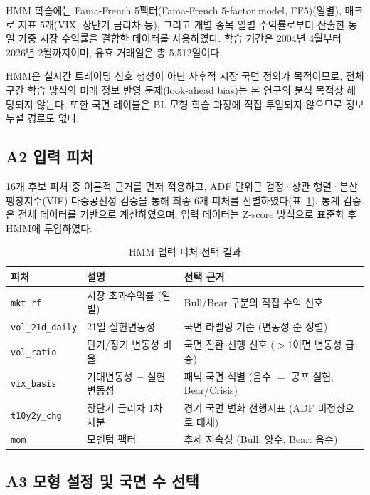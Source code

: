 \documentclass{article}
\begin{document}
HMM 학습에는 Fama-French 5팩터(Fama-French 5-factor model, FF5)(일별), 매크로 지표 5개(VIX, 장단기 금리차 등), 그리고 개별 종목 일별 수익률로부터 산출한 동일 가중 시장 수익률을 결합한 데이터를 사용하였다. 학습 기간은 2004년 4월부터 2026년 2월까지이며, 유효 거래일은 총 5,512일이다.

HMM은 실시간 트레이딩 신호 생성이 아닌 사후적 시장 국면 정의가 목적이므로, 전체 구간 학습 방식의 미래 정보 반영 문제(look-ahead bias)는 본 연구의 분석 목적상 해당되지 않는다. 또한 국면 레이블은 BL 모형 학습 과정에 직접 투입되지 않으므로 정보 누설 경로도 없다.

\subsection*{A2 입력 피처}

16개 후보 피처 중 이론적 근거를 먼저 적용하고, ADF 단위근 검정·상관 행렬·분산팽창지수(VIF) 다중공선성 검증을 통해 최종 6개 피처를 선별하였다(표~\ref{tab:a1_features}). 통계 검증은 전체 데이터를 기반으로 계산하였으며, 입력 데이터는 Z-score 방식으로 표준화 후 HMM에 투입하였다.

\begin{table}[ht]
\centering
\caption{HMM 입력 피처 선택 결과}
\label{tab:a1_features}
\begin{tabular}{lll}
\toprule
\textbf{피처} & \textbf{설명} & \textbf{선택 근거} \\
\midrule
\texttt{mkt\_rf}       & 시장 초과수익률 (일별)     & Bull/Bear 구분의 직접 수익 신호 \\
\texttt{vol\_21d\_daily} & 21일 실현변동성           & 국면 라벨링 기준 (변동성 순 정렬) \\
\texttt{vol\_ratio}    & 단기/장기 변동성 비율      & 국면 전환 선행 신호 ($>$1이면 변동성 급증) \\
\texttt{vix\_basis}    & 기대변동성 $-$ 실현변동성  & 패닉 국면 식별 (음수 $=$ 공포 실현, Bear/Crisis) \\
\texttt{t10y2y\_chg}   & 장단기 금리차 1차 차분     & 경기 국면 변화 선행지표 (ADF 비정상으로 대체) \\
\texttt{mom}           & 모멘텀 팩터               & 추세 지속성 (Bull: 양수, Bear: 음수) \\
\bottomrule
\end{tabular}
\end{table}

\subsection*{A3 모형 설정 및 국면 수 선택}
\end{document}
